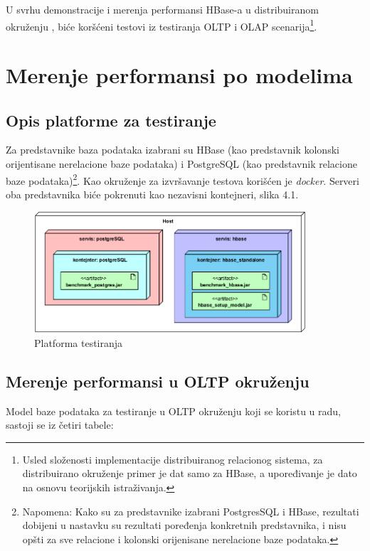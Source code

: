 \documentclass[12pt,oneside]{memoir}
\begin{document}
U svrhu demonstracije i merenja performansi HBase-a u distribuiranom okruženju , biće koršćeni testovi iz testiranja OLTP i OLAP  scenarija\footnote{Usled složenosti implementacije distribuiranog relacionog sistema, za distribuirano okruženje primer je dat samo za HBase, a upoređivanje je dato na osnovu teorijskih istraživanja.}.


\chapter{Merenje performansi po modelima}

\section{Opis platforme za testiranje}

Za predstavnike baza podataka izabrani su HBase (kao predstavnik kolonski orijentisane nerelacione baze podataka) i PostgreSQL (kao predstavnik relacione baze podataka)\footnote{Napomena: Kako su za predstavnike izabrani PostgresSQL i HBase, rezultati dobijeni u nastavku su rezultati poređenja konkretnih predstavnika, i nisu opšti za sve relacione i kolonski orijenisane nerelacione baze podataka.}.  Kao okruženje za izvršavanje testova  korišćen je \textit{docker}. Serveri oba predstavnika biće pokrenuti kao nezavisni kontejneri, slika 4.1. 

\begin{figure}[!ht]
  \centering
  \includegraphics[width=0.9\textwidth]{deployment_diagram.png}
  \caption{Platforma testiranja}
  \label{fig:grafikon}
\end{figure}


\section{Merenje performansi u OLTP okruženju}

Model baze podataka za testiranje u OLTP okruženju koji se koristu u radu, sastoji se iz četiri tabele:
\end{document}

